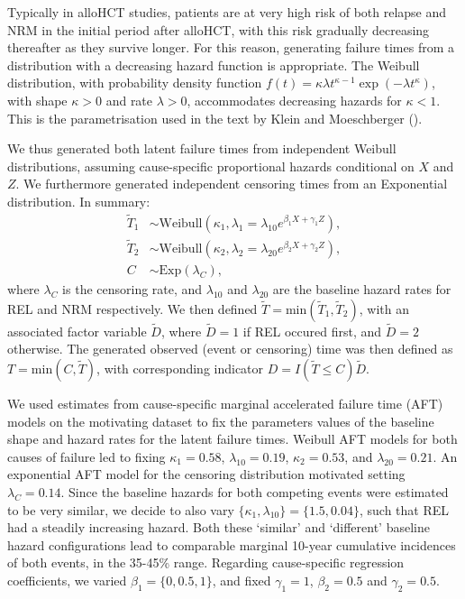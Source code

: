 \documentclass[
  letterpaper,
  paper=240mm:170mm,
  twoside=true,
  open=right,
  fontsize=10pt,
  pagesize=false,
  BCOR=15mm,
  DIV=14,
  headinclude=true,
  footinclude=false,
  headsepline=on]{scrbook}
\begin{document}
Typically in alloHCT studies, patients are at very high risk of both
relapse and NRM in the initial period after alloHCT, with this risk
gradually decreasing thereafter as they survive longer. For this reason,
generating failure times from a distribution with a decreasing hazard
function is appropriate. The Weibull distribution, with probability
density function
\(f(t) = \kappa \lambda t^{\kappa - 1} \exp (-\lambda t^{\kappa})\),
with shape \(\kappa > 0\) and rate \(\lambda > 0\), accommodates
decreasing hazards for \(\kappa < 1\). This is the parametrisation used
in the text by Klein and Moeschberger
().

We thus generated both latent failure times from independent Weibull
distributions, assuming cause-specific proportional hazards conditional
on \(X\) and \(Z\). We furthermore generated independent censoring times
from an Exponential distribution. In summary: \begin{align*}
    \tilde{T}_1 &\sim \text{Weibull}(\kappa_1, \lambda_1 = \lambda_{10}e^{\beta_1 X + \gamma_1 Z}), \\
    \tilde{T}_2 &\sim \text{Weibull}(\kappa_2, \lambda_2 = \lambda_{20}e^{\beta_2 X + \gamma_2 Z}), \\
    C &\sim \text{Exp}(\lambda_C),
\end{align*} where \(\lambda_C\) is the censoring rate, and
\(\lambda_{10}\) and \(\lambda_{20}\) are the baseline hazard rates for
REL and NRM respectively. We then defined
\(\tilde{T} = \text{min}(\tilde{T}_1, \tilde{T}_2)\), with an associated
factor variable \(\tilde{D}\), where \(\tilde{D} =1\) if REL occured
first, and \(\tilde{D} = 2\) otherwise. The generated observed (event or
censoring) time was then defined as \(T = \text{min}(C, \tilde{T})\),
with corresponding indicator \(D = I(\tilde{T} \leq C)\tilde{D}\).

We used estimates from cause-specific marginal accelerated failure time
(AFT) models on the motivating dataset to fix the parameters values of
the baseline shape and hazard rates for the latent failure times.
Weibull AFT models for both causes of failure led to fixing
\(\kappa_1 = 0.58\), \(\lambda_{10} = 0.19\), \(\kappa_2 = 0.53\), and
\(\lambda_{20} = 0.21\). An exponential AFT model for the censoring
distribution motivated setting \(\lambda_C = 0.14\). Since the baseline
hazards for both competing events were estimated to be very similar, we
decide to also vary \(\{\kappa_1,\lambda_{10}\} = \{1.5,0.04\}\), such
that REL had a steadily increasing hazard. Both these `similar' and
`different' baseline hazard configurations lead to comparable marginal
10-year cumulative incidences of both events, in the 35-45\% range.
Regarding cause-specific regression coefficients, we varied
\(\beta_1 = \{0, 0.5, 1\}\), and fixed \(\gamma_1 = 1\),
\(\beta_2 = 0.5\) and \(\gamma_2 = 0.5\).
\end{document}

